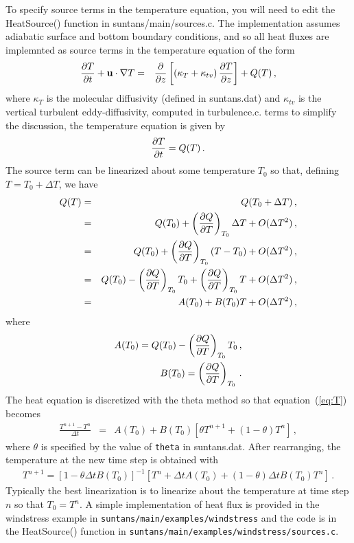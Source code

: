 To specify source terms in the temperature equation, you will need to edit the
HeatSource() function in suntans/main/sources.c.  The implementation assumes
adiabatic surface and bottom boundary conditions, and so all heat fluxes are implemnted
as source terms in the temperature equation of the form
\begin{eqnarray*}
\frac{\partial{T}}{\partial{t}} + \mathbf{u}\cdot\nabla T &=& \frac{\partial{}}{\partial{z}}\left[\left(\kappa_T + \kappa_{tv}\right) \frac{\partial{T}}{\partial{z}}\right] + Q(T)\,,
\end{eqnarray*}
where $\kappa_T$ is the molecular diffusivity (defined in suntans.dat) and $\kappa_{tv}$ is the
vertical turbulent eddy-diffusivity, computed in turbulence.c.  
terms to simplify the discussion, the temperature equation is given by
\begin{equation}\label{eq:T}
\frac{\partial{T}}{\partial{t}}  = Q(T)\,.
\end{equation}
The source term can be linearized about some temperature $T_0$ so that, defining $T=T_0 + \Delta T$,
we have
\begin{eqnarray*}
Q(T) &=& Q(T_0 + \Delta T)\,,\\
     &=& Q(T_0) + \left(\frac{\partial{Q}}{\partial{T}}\right)_{T_0}\Delta T  + O(\Delta T^2)\,,\\
     &=& Q(T_0) + \left(\frac{\partial{Q}}{\partial{T}}\right)_{T_0}\left(T - T_0\right)  + O(\Delta T^2)\,,\\
     &=& Q(T_0) - \left(\frac{\partial{Q}}{\partial{T}}\right)_{T_0}T_0 + \left(\frac{\partial{Q}}{\partial{T}}\right)_{T_0} T + O(\Delta T^2)\,,\\
     &=& A(T_0) + B(T_0) T + O(\Delta T^2)\,,
\end{eqnarray*}
where
\begin{eqnarray*}
A(T_0) = Q(T_0) - \left(\frac{\partial{Q}}{\partial{T}}\right)_{T_0}T_0\,,\\
B(T_0) = \left(\frac{\partial{Q}}{\partial{T}}\right)_{T_0}\,.
\end{eqnarray*}
The heat equation is discretized with the theta method so that equation~(\ref{eq:T}) becomes
\begin{eqnarray*}
\frac{T^{n+1} - T^n}{\Delta t} &=& A(T_0) + B(T_0)\left[\theta T^{n+1}+(1-\theta)T^n\right]\,,
\end{eqnarray*}
where $\theta$ is specified by the value of \verb+theta+ in suntans.dat.
After rearranging, the temperature at the new time step is obtained with
\begin{eqnarray*}
T^{n+1} = \left[1 - \theta \Delta t B(T_0)\right]^{-1}\left[T^n + \Delta t A(T_0) 
                  + (1-\theta) \Delta t B(T_0)T^n\right]\,.
\end{eqnarray*}
Typically the best linearization is to linearize about the temperature at time step $n$ so
that $T_0=T^n$. A simple implementation of heat flux is provided in the windstress example
in \verb+suntans/main/examples/windstress+ and the code is in the HeatSource() function in
\verb+suntans/main/examples/windstress/sources.c+.


